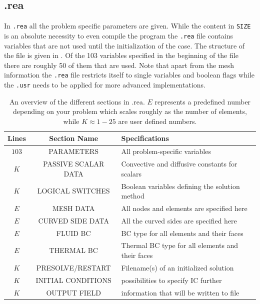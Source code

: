 \subsection{.rea}

In \verb|.rea| all the problem specific parameters are given. While the content in \verb|SIZE| 
is an absolute necessity to even compile the program the \verb|.rea| file contains variables 
that are not used until the initialization of the case. The structure of the file is given in .
Of the 103 variables specified in the beginning of the file there are roughly 50 of them that are used. 
Note that apart from the mesh information the \verb|.rea| file restricts itself to single variables and boolean flags 
while the \verb|.usr| needs to be applied for more advanced implementations. 
%
\begin{table}[h]
    \centering
    \begin{tabular}{c c l}
       Lines & Section Name & Specifications \\ \hline
       $103$ & PARAMETERS & All problem-specific variables \\ 
       $K$ & PASSIVE SCALAR DATA & Convective and diffusive constants for scalars\\ 
       $K$ & LOGICAL SWITCHES & Boolean variables defining the solution method \\ 
       $E$ & MESH DATA & All nodes and elements are specified here\\
       $E$ & CURVED SIDE DATA & All the curved sides are specified here\\
       $E$ & FLUID BC& BC type for all elements and their faces\\
       $E$ & THERMAL BC& Thermal BC type for all elements and their faces\\
       $K$ & PRESOLVE/RESTART & Filename(s) of an initialized solution \\
       $K$ & INITIAL CONDITIONS & possibilities to specify IC further \\
       $K$ & OUTPUT FIELD & information that will be written to file\\
    \end{tabular}
    \caption{An overview of the different sections in .rea. $E$ represents a predefined number depending on your problem
    which scales roughly as the number of elements, while $K\approx 1-25$ are user defined numbers.}
    \label{tab:reafile}
\end{table}
%
